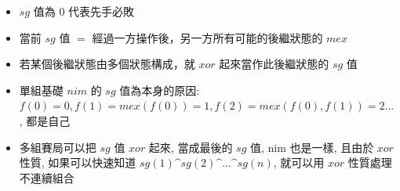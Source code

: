 \begin{itemize}
	\item $sg$ 值為 $0$ 代表先手必敗
	\item 當前 $sg$ 值 $=$ 經過一方操作後，另一方所有可能的後繼狀態的 $mex$
	\item 若某個後繼狀態由多個狀態構成，就 $xor$ 起來當作此後繼狀態的 $sg$ 值
	\item 單組基礎 $nim$ 的 $sg$ 值為本身的原因: $f(0) = 0, f(1) = mex(f(0)) = 1, f(2) = mex(f(0), f(1)) = 2 ...$, 都是自己
	\item 多組賽局可以把 $sg$ 值 $xor$ 起來, 當成最後的 $sg$ 值, nim 也是一樣, 且由於 $xor$ 性質, 如果可以快速知道 $sg(1) \^ sg(2) \^ ... \^ sg(n)$, 就可以用 $xor$ 性質處理不連續組合
\end{itemize}